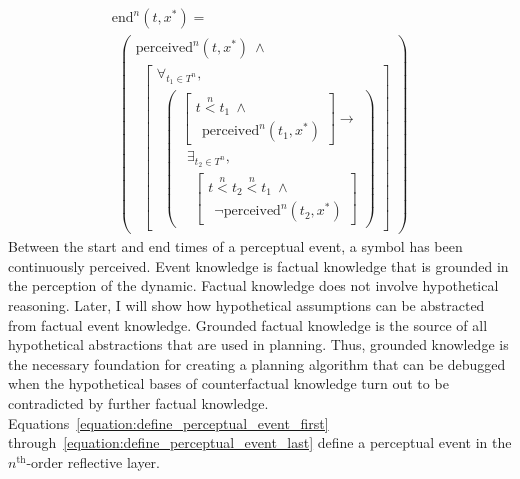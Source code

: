 \begin{equation}
\label{equation:define_event_end}
\begin{array}{l}
  \text{end}^n(t, x^*) = \\
  ~~\left(
  \begin{array}{l}
  \text{perceived}^n(t, x^*) ~\wedge~ \\
  ~~\left[
  \begin{array}{l}
  \forall_{t_1 \in T^n}, \\
  ~~\left(\begin{array}{l}
            \left[\begin{array}{l}
                    t \stackrel{n}{<} t_1 ~\wedge~ \\
                    ~~\text{perceived}^n(t_1, x^*)\end{array}\right] \longrightarrow \\
            ~~\exists_{t_2 \in T^n}, \\
            ~~~~\left[\begin{array}{l}
                        t \stackrel{n}{<} t_2 \stackrel{n}{<} t_1 ~\wedge~ \\
                        ~~\neg\text{perceived}^n(t_2, x^*)\end{array}\right]\end{array}\right)
  \end{array}
  \right]
  \end{array}\right)
\end{array}
\end{equation}
Between the start and end times of a perceptual event, a symbol has
been continuously perceived.  Event knowledge is factual knowledge
that is grounded in the perception of the dynamic.  Factual knowledge
does not involve hypothetical reasoning.  Later, I will show how
hypothetical assumptions can be abstracted from factual event
knowledge.  Grounded factual knowledge is the source of all
hypothetical abstractions that are used in planning.  Thus, grounded
knowledge is the necessary foundation for creating a planning
algorithm that can be debugged when the hypothetical bases of
counterfactual knowledge turn out to be contradicted by further
factual knowledge.
{\mbox{Equations~\ref{equation:define_perceptual_event_first}}}
{\mbox{through~\ref{equation:define_perceptual_event_last}}} define a
perceptual event in the $n^{\text{th}}$-order reflective layer.
